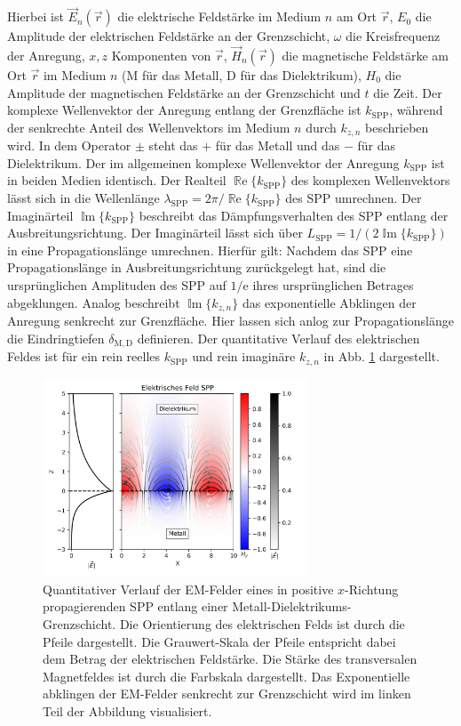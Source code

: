 \documentclass[titlepage,  ngerman]{article}
\renewcommand{\Re}{\operatorname{\mathbb{R}e}}
\renewcommand{\Im}{\operatorname{\mathbb{I}m}}
\begin{document}
	Hierbei ist $\vec{E}_n(\vec{r})$ die elektrische Feldstärke im Medium $n$ am Ort $\vec{r}$, $E_0$ die Amplitude der elektrischen Feldstärke an der Grenzschicht, $\omega$ die Kreisfrequenz der Anregung, $x, z$ Komponenten von $\vec{r}$, $\vec{H}_n(\vec{r})$ die magnetische Feldstärke am Ort $\vec{r}$ im Medium $n$ ($\mathrm{M}$ für das Metall, $\mathrm{D}$ für das Dielektrikum), $H_0$ die Amplitude der magnetischen Feldstärke an der Grenzschicht und $t$ die Zeit. Der komplexe Wellenvektor der Anregung entlang der Grenzfläche ist $k_{\mathrm{SPP}}$, während der senkrechte Anteil des Wellenvektors im Medium $n$ durch $k_{z,n}$ beschrieben wird.
	In dem Operator $\pm$ steht das $+$ für das Metall und das $-$ für das Dielektrikum. Der im allgemeinen komplexe Wellenvektor der Anregung $k_{\mathrm{SPP}}$ ist in beiden Medien identisch. Der Realteil $\Re\{k_{\mathrm{SPP}}\}$ des komplexen Wellenvektors lässt sich in die Wellenlänge $\lambda_{\mathrm{SPP}} = 2\pi/ \Re\{k_{\mathrm{SPP}}\} $ des SPP umrechnen. Der Imaginärteil $\Im\{k_{\mathrm{SPP}}\}$ beschreibt das Dämpfungsverhalten des SPP entlang der Ausbreitungsrichtung. Der Imaginärteil lässt sich über $L_{\mathrm{SPP}} = 1/(2\Im\{k_{\mathrm{SPP}}\})$ in eine Propagationslänge umrechnen.  Hierfür gilt: Nachdem das SPP eine Propagationslänge in Ausbreitungsrichtung zurückgelegt hat, sind die ursprünglichen Amplituden des SPP auf $1/\mathrm{e}$ ihres ursprünglichen Betrages abgeklungen. Analog beschreibt $\Im\{k_{z, n}\}$ das exponentielle Abklingen der Anregung senkrecht zur Grenzfläche. Hier lassen sich anlog zur Propagationslänge die Eindringtiefen $\delta_{\mathrm{M,D}}$ definieren. Der quantitative Verlauf des elektrischen Feldes ist für ein rein reelles $k_{\mathrm{SPP}}$ und rein imaginäre $k_{z, n}$ in Abb. \ref{fig:electric_field_spp} dargestellt. 
	\begin{figure}[h] 
		\centering
		\includegraphics[width=0.7\textwidth]{figures/E_Feld_SPP.png}
		\caption[Feldorientierung SPP]{Quantitativer Verlauf der EM-Felder eines in positive $x$-Richtung propagierenden SPP entlang einer Metall-Dielektrikums-Grenzschicht. Die Orientierung des elektrischen Felds ist durch die Pfeile dargestellt. Die Grauwert-Skala der Pfeile entspricht dabei dem Betrag der elektrischen Feldstärke. Die Stärke des transversalen Magnetfeldes ist durch die Farbskala dargestellt. Das Exponentielle abklingen der EM-Felder senkrecht zur Grenzschicht wird im linken Teil der Abbildung visualisiert.}
		\label{fig:electric_field_spp}
	\end{figure}
	
\end{document}
